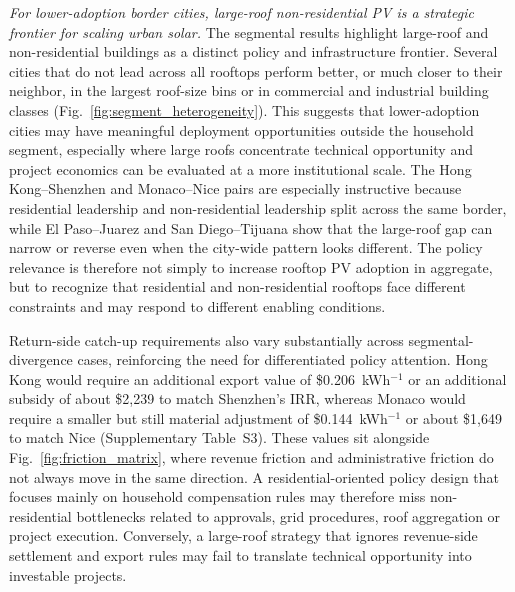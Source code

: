 \documentclass[pdflatex,sn-nature]{sn-jnl}
\begin{document}
\emph{For lower-adoption border cities, large-roof non-residential PV is a strategic frontier for scaling urban solar.} The segmental results highlight large-roof and non-residential buildings as a distinct policy and infrastructure frontier. Several cities that do not lead across all rooftops perform better, or much closer to their neighbor, in the largest roof-size bins or in commercial and industrial building classes (Fig.~\ref{fig:segment_heterogeneity}). This suggests that lower-adoption cities may have meaningful deployment opportunities outside the household segment, especially where large roofs concentrate technical opportunity and project economics can be evaluated at a more institutional scale. The Hong Kong--Shenzhen and Monaco--Nice pairs are especially instructive because residential leadership and non-residential leadership split across the same border, while El Paso--Juarez and San Diego--Tijuana show that the large-roof gap can narrow or reverse even when the city-wide pattern looks different. The policy relevance is therefore not simply to increase rooftop PV adoption in aggregate, but to recognize that residential and non-residential rooftops face different constraints and may respond to different enabling conditions.

Return-side catch-up requirements also vary substantially across segmental-divergence cases, reinforcing the need for differentiated policy attention. Hong Kong would require an additional export value of \$0.206~kWh$^{-1}$ or an additional subsidy of about \$2,239 to match Shenzhen's IRR, whereas Monaco would require a smaller but still material adjustment of \$0.144~kWh$^{-1}$ or about \$1,649 to match Nice (Supplementary Table~S3). These values sit alongside Fig.~\ref{fig:friction_matrix}, where revenue friction and administrative friction do not always move in the same direction. A residential-oriented policy design that focuses mainly on household compensation rules may therefore miss non-residential bottlenecks related to approvals, grid procedures, roof aggregation or project execution. Conversely, a large-roof strategy that ignores revenue-side settlement and export rules may fail to translate technical opportunity into investable projects.
\end{document}
